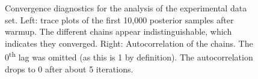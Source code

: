 \documentclass[a4paper]{article}
\begin{document}
\begin{figure}[!ht]
\begin{subfigure}{.5\textwidth}
	\end{subfigure}%
	\caption{
		Convergence diagnostics for the analysis of the experimental data set.
		Left: trace plots of the first 10,000 posterior samples after warmup. The different chains appear indistinguishable, which indicates they converged. Right: Autocorrelation of the chains. The 0\textsuperscript{th} lag was omitted (as this is 1 by definition). The autocorrelation drops to 0 after about 5 iterations.}
	\label{fig:baselinePosteriorDiagnostics}
\end{figure}
\end{document}
